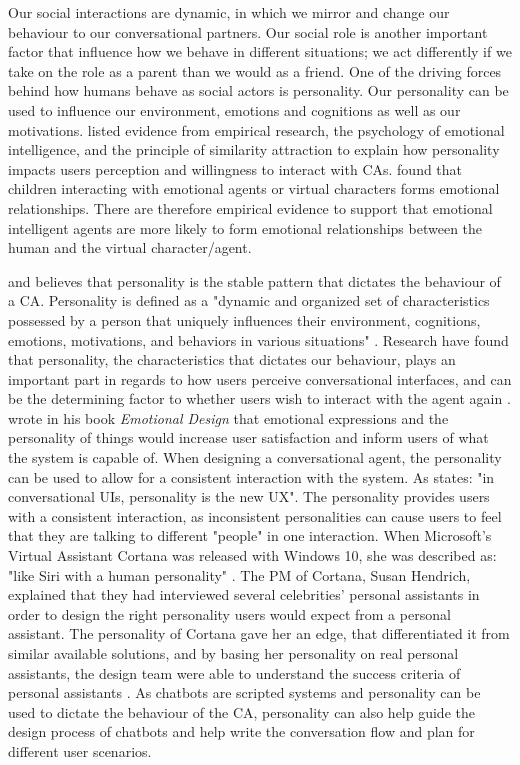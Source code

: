 Our social interactions are dynamic, in which we mirror and change our behaviour to our conversational partners. Our social role is another important factor that influence how we behave in different situations; we act differently if we take on the role as a parent than we would as a friend. One of the driving forces behind how humans behave as social actors is personality. Our personality can be used to influence our environment, emotions and cognitions as well as our motivations. \cite{callejas2011} listed evidence from empirical research, the psychology of emotional intelligence, and the principle of similarity attraction to explain how personality impacts users perception and willingness to interact with CAs. \cite{Stern2003} found that children interacting with emotional agents or virtual characters forms emotional relationships. There are therefore empirical evidence to support that emotional intelligent agents are more likely to form emotional relationships between the human and the virtual character/agent. 

\cite{callejas2011} and \cite{Xiao2005} believes that personality is the stable pattern that dictates the behaviour of a CA. Personality is defined as a "dynamic and organized set of characteristics possessed by a person that uniquely influences their environment, cognitions, emotions, motivations, and behaviors in various situations" \citep{McTear2016b}. Research have found that personality, the characteristics that dictates our behaviour, plays an important part in regards to how users perceive conversational interfaces, and can be the determining factor to whether users wish to interact with the agent again \citep{callejas2011}. \cite{Norman2007} wrote in his book \textit{Emotional Design} that emotional expressions and the personality of things would increase user satisfaction and inform users of what the system is capable of. When designing a conversational agent, the personality can be used to allow for a consistent interaction with the system. As \cite{pavlus2016} states: "in conversational UIs, personality is the new UX". The personality provides users with a consistent interaction, as inconsistent personalities can cause users to feel that they are talking to different "people" in one interaction. When Microsoft's Virtual Assistant Cortana was released with Windows 10, she was described as: "like Siri with a human personality" \citep{beres2015}. The PM of Cortana, Susan Hendrich, explained that they had interviewed several celebrities' personal assistants in order to design the right personality users would expect from a personal assistant. The personality of Cortana gave her an edge, that differentiated it from similar available solutions, and by basing her personality on real personal assistants, the design team were able to understand the success criteria of personal assistants \citep{hendrich2017}. As chatbots are scripted systems and personality can be used to dictate the behaviour of the CA, personality can also help guide the design process of chatbots and help write the conversation flow and plan for different user scenarios.

